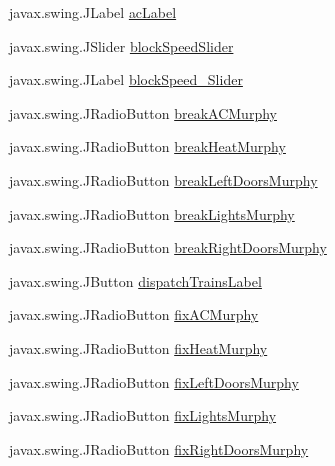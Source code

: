 \begin{DoxyCompactItemize}
\item 
javax.\+swing.\+J\+Label \hyperlink{classTrainControllerComps_1_1TCTestConsole_af98035d73b1947ae389e67eeea4993c5}{ac\+Label}
\item 
javax.\+swing.\+J\+Slider \hyperlink{classTrainControllerComps_1_1TCTestConsole_a21bee125a17a7768a07a80d7783cf294}{block\+Speed\+Slider}
\item 
javax.\+swing.\+J\+Label \hyperlink{classTrainControllerComps_1_1TCTestConsole_ab79e1ccde06435df2e134bbe2a5f8742}{block\+Speed\+\_\+\+Slider}
\item 
javax.\+swing.\+J\+Radio\+Button \hyperlink{classTrainControllerComps_1_1TCTestConsole_a7d492665eb6c6971989ec2dc0466114a}{break\+A\+C\+Murphy}
\item 
javax.\+swing.\+J\+Radio\+Button \hyperlink{classTrainControllerComps_1_1TCTestConsole_a5a940e86e0d4401daea1572b40981510}{break\+Heat\+Murphy}
\item 
javax.\+swing.\+J\+Radio\+Button \hyperlink{classTrainControllerComps_1_1TCTestConsole_a684b806da57a86a664067abba549d03b}{break\+Left\+Doors\+Murphy}
\item 
javax.\+swing.\+J\+Radio\+Button \hyperlink{classTrainControllerComps_1_1TCTestConsole_accd7d43228d9317a1324e18187f3e037}{break\+Lights\+Murphy}
\item 
javax.\+swing.\+J\+Radio\+Button \hyperlink{classTrainControllerComps_1_1TCTestConsole_a66d910f995ad161cb6423f9609dc3410}{break\+Right\+Doors\+Murphy}
\item 
javax.\+swing.\+J\+Button \hyperlink{classTrainControllerComps_1_1TCTestConsole_ab1001e48d1473360905ff0456d2b6da2}{dispatch\+Trains\+Label}
\item 
javax.\+swing.\+J\+Radio\+Button \hyperlink{classTrainControllerComps_1_1TCTestConsole_a894040a202ec98ab18e585759f783d36}{fix\+A\+C\+Murphy}
\item 
javax.\+swing.\+J\+Radio\+Button \hyperlink{classTrainControllerComps_1_1TCTestConsole_aa536edd88e360f85dd5b3c183fb7bad7}{fix\+Heat\+Murphy}
\item 
javax.\+swing.\+J\+Radio\+Button \hyperlink{classTrainControllerComps_1_1TCTestConsole_af8181606847a064fef6388178f6345df}{fix\+Left\+Doors\+Murphy}
\item 
javax.\+swing.\+J\+Radio\+Button \hyperlink{classTrainControllerComps_1_1TCTestConsole_a64fb6ca41cae7641dc33c8095ffd9fdb}{fix\+Lights\+Murphy}
\item 
javax.\+swing.\+J\+Radio\+Button \hyperlink{classTrainControllerComps_1_1TCTestConsole_aa2c97390a7e262a469599bcb59f5a9c9}{fix\+Right\+Doors\+Murphy}

\end{DoxyCompactItemize}
